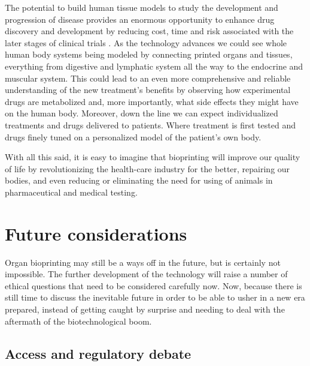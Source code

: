 \documentclass[12pt]{article} %
\begin{document}
The potential to build human tissue models to study the development and progression of disease provides an enormous opportunity to enhance drug discovery and development by reducing cost, time and risk associated with the later stages of clinical trials \cite{Visk:2015}. As the technology advances we could see whole human body systems being modeled by connecting printed organs and tissues, everything from digestive and lymphatic system all the way to the endocrine and muscular system. This could lead to an even more comprehensive and reliable understanding of the new treatment's benefits by observing how experimental drugs are metabolized and, more importantly, what side effects they might have on the human body. Moreover, down the line we can expect individualized treatments and drugs delivered to patients. Where treatment is first tested and drugs finely tuned on a personalized model of the patient's own body. 

With all this said, it is easy to imagine that bioprinting will improve our quality of life by revolutionizing the health-care industry for the better, repairing our bodies, and even reducing or eliminating the need for using of animals in pharmaceutical and medical testing.


\newpage 


\section{Future considerations} %

Organ bioprinting may still be a ways off in the future, but is certainly not impossible. The further development of the technology will raise a number of ethical questions that need to be considered carefully now. Now, because there is still time to discuss the inevitable future in order to be able to usher in a new era prepared, instead of getting caught by surprise and needing to deal with the aftermath of the biotechnological boom. 


\subsection{Access and regulatory debate} %
\end{document}
